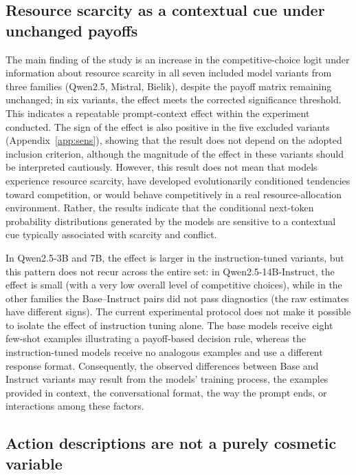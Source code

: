 \documentclass[11pt]{article}
\begin{document}
\subsection{Resource scarcity as a contextual cue under unchanged payoffs}

The main finding of the study is an increase in the competitive-choice logit under information about resource scarcity in all seven included model variants from three families (Qwen2.5, Mistral, Bielik), despite the payoff matrix remaining unchanged; in six variants, the effect meets the corrected significance threshold. This indicates a repeatable prompt-context effect within the experiment conducted. The sign of the effect is also positive in the five excluded variants (Appendix~\ref{app:sens}), showing that the result does not depend on the adopted inclusion criterion, although the magnitude of the effect in these variants should be interpreted cautiously. However, this result does not mean that models experience resource scarcity, have developed evolutionarily conditioned tendencies toward competition, or would behave competitively in a real resource-allocation environment. Rather, the results indicate that the conditional next-token probability distributions generated by the models are sensitive to a contextual cue typically associated with scarcity and conflict.

In Qwen2.5-3B and 7B, the effect is larger in the instruction-tuned variants, but this pattern does not recur across the entire set: in Qwen2.5-14B-Instruct, the effect is small (with a very low overall level of competitive choices), while in the other families the Base--Instruct pairs did not pass diagnostics (the raw estimates have different signs). The current experimental protocol does not make it possible to isolate the effect of instruction tuning alone. The base models receive eight few-shot examples illustrating a payoff-based decision rule, whereas the instruction-tuned models receive no analogous examples and use a different response format. Consequently, the observed differences between Base and Instruct variants may result from the models' training process, the examples provided in context, the conversational format, the way the prompt ends, or interactions among these factors.

\subsection{Action descriptions are not a purely cosmetic variable}
\end{document}
